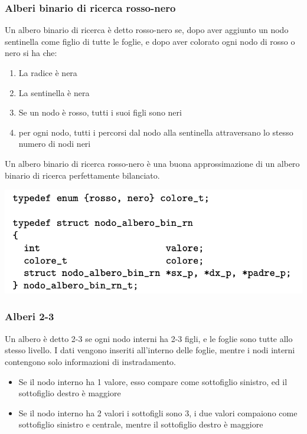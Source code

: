 \documentclass[11pt, oneside]{article}   	%
\begin{document}
\subsubsection{Alberi binario di ricerca rosso-nero}
Un albero binario di ricerca è detto rosso-nero se, dopo aver aggiunto un nodo sentinella come figlio di tutte le foglie, e dopo aver colorato ogni nodo di rosso o nero si ha che:
\begin{enumerate}
\item La radice è nera
\item La sentinella è nera
\item Se un nodo è rosso, tutti i suoi figli sono neri
\item per ogni nodo, tutti i percorsi dal nodo alla sentinella attraversano lo stesso numero di nodi neri
\end{enumerate}
Un albero binario di ricerca rosso-nero è una buona approssimazione di un albero binario di ricerca perfettamente bilanciato. 
\begin{center}
\includegraphics[scale=0.8]{rossonero}
\end{center}
\subsubsection{Alberi 2-3}
Un albero è detto 2-3 se ogni nodo interni ha 2-3 figli, e le foglie sono tutte allo stesso livello. I dati vengono inseriti all'interno delle foglie, mentre i nodi interni contengono solo informazioni di instradamento.\begin{itemize}
\item Se il nodo interno ha 1 valore, esso compare come sottofiglio sinistro, ed il sottofiglio destro è maggiore
\item Se il nodo interno ha 2 valori i sottofigli sono 3, i due valori compaiono come sottofiglio sinistro e centrale, mentre il sottofiglio destro è maggiore
\end{itemize}
\end{document}
